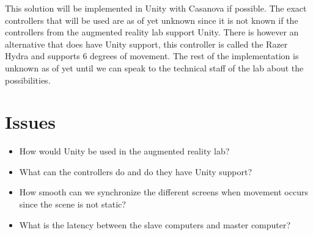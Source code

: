 \documentclass[10pt,a4paper]{article}
\begin{document}
This solution will be implemented in Unity with Casanova if possible. The exact controllers that will be used are as of yet unknown since it is not known if the controllers from the augmented reality lab support Unity. There is however an alternative that does have Unity support, this controller is called the Razer Hydra and supports 6 degrees of movement. The rest of the implementation is unknown as of yet until we can speak to the technical staff of the lab about the possibilities.

\section{Issues}
\begin{itemize}
\item How would Unity be used in the augmented reality lab?
\item What can the controllers do and do they have Unity support?
\item How smooth can we synchronize the different screens when movement occurs since the scene is not static?
\item What is the latency between the slave computers and master computer?
\end{itemize}
\end{document}
